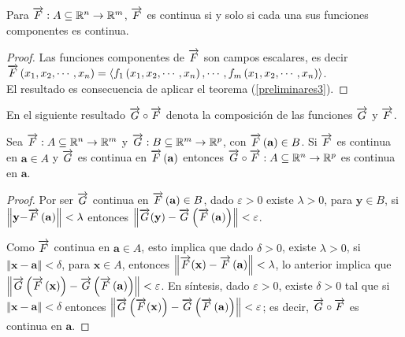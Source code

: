 \begin{teorema}\label{preliminares6} Para $\overrightarrow{F}:A \subseteq\mathbb{R}^{n}\rightarrow \mathbb{R}^{m}$,
  $\overrightarrow{F}$ es continua si y solo si cada una sus funciones componentes es continua.
\end{teorema}

\begin{proof}
  Las funciones componentes de $\overrightarrow{F}$ son campos escalares, es decir
  {\small $\overrightarrow{F}\left( x_{1},x_{2},\cdots ,x_{n}\right) =\left\langle f_{1}\left(x_{1},x_{2},\cdots ,x_{n}\right) ,\cdots ,f_{m}\left( x_{1},x_{2},\cdots ,x_{n}\right)\right\rangle$.} \\
  El resultado es consecuencia de aplicar el teorema (\ref{preliminares3}).
\end{proof}

En el siguiente resultado $\overrightarrow{G}\circ \overrightarrow{F}$ denota la composición de las funciones $\overrightarrow{G}$ y $\overrightarrow{F}$.

\begin{teorema}
  \normalfont Sea $\overrightarrow{F}:A\subseteq \mathbb{R}^n\to \mathbb{R}^m$ y
  $\overrightarrow{G}:B\subseteq \mathbb{R}^m\to \mathbb{R}^p$, con
  $\overrightarrow{F}\left( \mathbf{a}\right) \in B$. Si $\overrightarrow{F}$ es continua en
  $\mathbf{a}\in A$ y $\overrightarrow{G}$ es continua en $\overrightarrow{F}\left( \mathbf{a}\right) $
  entonces $\overrightarrow{G}\circ \overrightarrow{F}:A\subseteq \mathbb{R}^n\to \mathbb{R}^p$ es continua en $\mathbf{a}${\normalfont.}
\end{teorema}

\begin{proof}
  Por ser $\overrightarrow{G}$ continua en $\overrightarrow{F}\left( \mathbf{a}\right) \in B$, dado $\varepsilon >0$
  existe $\lambda >0$, para $\mathbf{y} \in B$, si $\left\Vert \mathbf{y-}\overrightarrow{F}\left( \mathbf{a}\right)
  \right\Vert <\lambda $ entonces $\left\Vert \overrightarrow{G}(\mathbf{y})-\overrightarrow{G}\left( \overrightarrow{F}\left( \mathbf{a}\right) \right) \right\Vert <\varepsilon $.

  Como $\overrightarrow{F}$ continua en $\mathbf{a}\in A$, esto implica que dado
  $\delta >0$, existe $\lambda >0$,  si $\left\Vert \mathbf{x-a}\right\Vert <\delta $, para $\mathbf{x}\in A$,
  entonces $\left\Vert \overrightarrow{F}(\mathbf{x}) -\overrightarrow{F}\left( \mathbf{a}\right) \right\Vert <\lambda $,
  lo anterior implica que
  $\left\Vert \overrightarrow{G}\left( \overrightarrow{F}\left( \mathbf{x} \right) \right) -\overrightarrow{G}\left( \overrightarrow{F}\left(
  \mathbf{a}\right) \right) \right\Vert <\varepsilon $.
  En síntesis, dado $\varepsilon >0$, existe $\delta >0$ tal que si
  $\left\Vert \mathbf{x-a}\right\Vert <\delta $ entonces
  $\left\Vert \overrightarrow{G} \left( \overrightarrow{F}(\mathbf{x}) \right) -\overrightarrow{G}\left( \overrightarrow{F}\left( \mathbf{a}\right) \right)
  \right\Vert <\varepsilon$; es decir, $\overrightarrow{G}\circ \overrightarrow{F}$ es continua en $\mathbf{a}$.
\end{proof}

